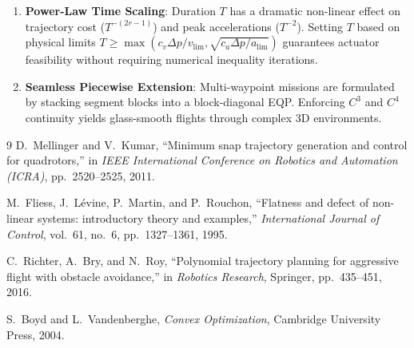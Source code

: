 \documentclass[11pt,a4paper]{article}
\begin{document}
\begin{examplebox}
\begin{enumerate}
    \item \textbf{Power-Law Time Scaling}: Duration $T$ has a dramatic non-linear effect on trajectory cost ($T^{-(2r-1)}$) and peak accelerations ($T^{-2}$). Setting $T$ based on physical limits $T \ge \max(c_v \Delta p / v_{\lim}, \sqrt{c_a \Delta p / a_{\lim}})$ guarantees actuator feasibility without requiring numerical inequality iterations.
    \item \textbf{Seamless Piecewise Extension}: Multi-waypoint missions are formulated by stacking segment blocks into a block-diagonal EQP. Enforcing $C^3$ and $C^4$ continuity yields glass-smooth flights through complex 3D environments.
\end{enumerate}
\end{examplebox}

\begin{thebibliography}{9}
D.~Mellinger and V.~Kumar, ``Minimum snap trajectory generation and control for quadrotors,'' in \emph{IEEE International Conference on Robotics and Automation (ICRA)}, pp.~2520--2525, 2011.

M.~Fliess, J.~L{\'e}vine, P.~Martin, and P.~Rouchon, ``Flatness and defect of non-linear systems: introductory theory and examples,'' \emph{International Journal of Control}, vol.~61, no.~6, pp.~1327--1361, 1995.

C.~Richter, A.~Bry, and N.~Roy, ``Polynomial trajectory planning for aggressive flight with obstacle avoidance,'' in \emph{Robotics Research}, Springer, pp.~435--451, 2016.

S.~Boyd and L.~Vandenberghe, \emph{Convex Optimization}, Cambridge University Press, 2004.
\end{thebibliography}
\end{document}
